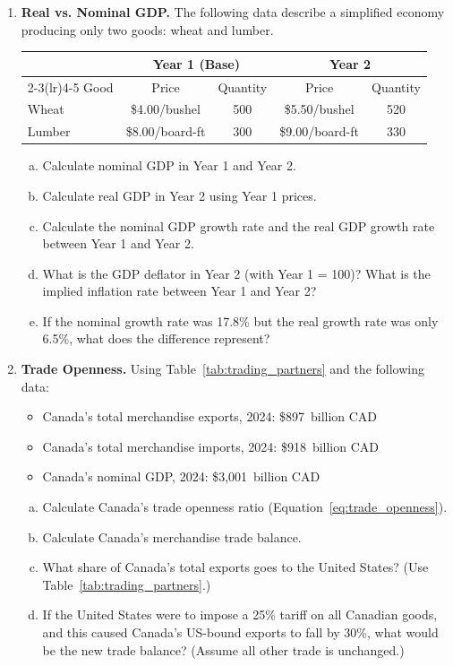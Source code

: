 \begin{enumerate}
\item \textbf{Real vs. Nominal GDP.} The following data describe a
simplified economy producing only two goods: wheat and lumber.
\begin{center}
\begin{tabular}{lcccc}
\toprule
& \multicolumn{2}{c}{\textbf{Year 1 (Base)}} & \multicolumn{2}{c}{\textbf{Year 2}} \\
\cmidrule(lr){2-3}\cmidrule(lr){4-5}
Good & Price & Quantity & Price & Quantity \\
\midrule
Wheat  & \$4.00/bushel & 500 & \$5.50/bushel & 520 \\
Lumber & \$8.00/board-ft & 300 & \$9.00/board-ft & 330 \\
\bottomrule
\end{tabular}
\end{center}
\begin{enumerate}[(a)]
  \item Calculate nominal GDP in Year 1 and Year 2.
  \item Calculate real GDP in Year 2 using Year 1 prices.
  \item Calculate the nominal GDP growth rate and the real GDP growth rate
        between Year 1 and Year 2.
  \item What is the GDP deflator in Year 2 (with Year 1 = 100)?
        What is the implied inflation rate between Year 1 and Year 2?
  \item If the nominal growth rate was 17.8\% but the real growth rate
        was only 6.5\%, what does the difference represent?
\end{enumerate}

\item \textbf{Trade Openness.} Using Table~\ref{tab:trading_partners}
and the following data:
\begin{itemize}
  \item Canada's total merchandise exports, 2024: \$897~billion CAD
  \item Canada's total merchandise imports, 2024: \$918~billion CAD
  \item Canada's nominal GDP, 2024: \$3,001~billion CAD
\end{itemize}
\begin{enumerate}[(a)]
  \item Calculate Canada's trade openness ratio
        (Equation~\ref{eq:trade_openness}).
  \item Calculate Canada's merchandise trade balance.
  \item What share of Canada's total exports goes to the United States?
        (Use Table~\ref{tab:trading_partners}.)
  \item If the United States were to impose a 25\% tariff on all
        Canadian goods, and this caused Canada's US-bound exports to
        fall by 30\%, what would be the new trade balance?
        (Assume all other trade is unchanged.)
\end{enumerate}


\end{enumerate}
